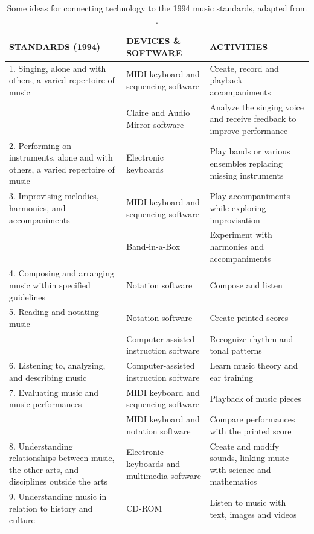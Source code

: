 \documentclass[10pt,journal,compsoc]{IEEEtran}
\begin{document}
\begin{table}[htbp]
	\caption{Some ideas for connecting technology to the 1994 music standards, adapted from %
		\cite{rudolph2004teaching}.}
	\label{tab:rudolph}
	\centering
	\begin{tabular}{p{}p{}p{}}\\
		STANDARDS (1994) & DEVICES \& SOFTWARE & ACTIVITIES\\
		\hline\noalign{\smallskip}
		1. Singing, alone and with others, a varied repertoire of music & MIDI keyboard and sequencing software & Create, record and playback accompaniments\\
		& Claire and Audio Mirror software & Analyze the singing voice and receive feedback to improve performance
		\\
		\hline\noalign{\smallskip}
		2. Performing on instruments, alone and with others, a varied
		repertoire of music & Electronic keyboards & Play bands or various ensembles replacing missing instruments\\
		
		\hline\noalign{\smallskip}
		3. Improvising melodies, harmonies, and accompaniments & MIDI keyboard and sequencing software & Play accompaniments while exploring improvisation \\
		& Band-in-a-Box & Experiment with harmonies and accompaniments\\
		\hline\noalign{\smallskip}
		
		4. Composing and arranging music within specified guidelines & Notation software & Compose and listen\\
		
		\hline\noalign{\smallskip}
		5. Reading and notating music & Notation software & Create printed scores
		\\& Computer-assisted instruction software & Recognize rhythm and tonal patterns\\
		
		\hline\noalign{\smallskip}
		6. Listening to, analyzing, and describing music & Computer-assisted instruction software & Learn music theory and ear training\\
		
		\hline\noalign{\smallskip}
		7. Evaluating music and music performances & MIDI keyboard and sequencing software & Playback of music pieces\\

		& MIDI keyboard and notation software & Compare performances with the printed score\\
		
		\hline\noalign{\smallskip}
		8. Understanding relationships between music, the other arts,
		and disciplines outside the arts & Electronic keyboards and multimedia software & Create and modify sounds, linking music with science and mathematics\\
		
		\hline\noalign{\smallskip}
		9. Understanding music in relation to history and culture & CD-ROM & Listen to music with text, images and videos\\
	\end{tabular}
\end{table}
\end{document}
